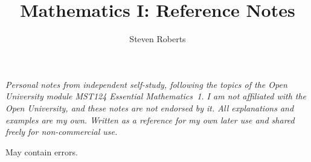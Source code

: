 \documentclass[11pt]{article}
\title{Mathematics I: Reference Notes}
\author{Steven Roberts}
\date{}
\begin{document}
\maketitle

\begin{center}
  \begin{minipage}{0.85\textwidth}
    \small\itshape\centering
    Personal notes from independent self-study, following the topics of
    the Open University module MST124 Essential Mathematics~1. I am not
    affiliated with the Open University, and these notes are not endorsed
    by it. All explanations and examples are my own. Written as a
    reference for my own later use and shared freely for non-commercial
    use.\par
    \vspace{4pt}
    May contain errors.
  \end{minipage}
\end{center}

\tableofcontents


% 
% 
% 
% 
% 
% 
% 
% 
% 
% 
% 
\end{document}

